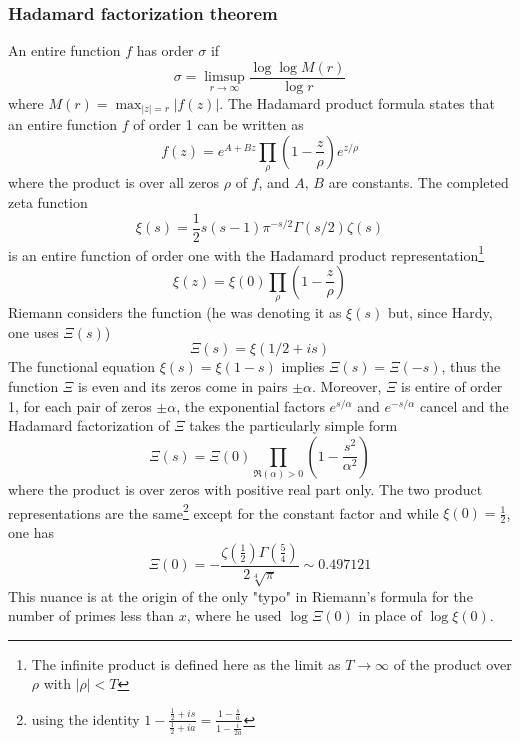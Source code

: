 \documentclass{article}
\begin{document}
   \subsubsection{Hadamard factorization theorem}\label{hadfact} An entire function $f$ has order $\sigma$ if
$$\sigma = \limsup_{r \to \infty} \frac{\log \log M(r)}{\log r}$$
where $M(r) = \max_{|z|=r} |f(z)|$. The Hadamard product formula states that an entire function $f$ of order 1 can be written as
$$f(z) = e^{A + Bz} \prod_{\rho} \left(1 - \frac{z}{\rho}\right) e^{z/\rho}$$
where the product is over all zeros $\rho$ of $f$, and $A$, $B$ are constants. 
The completed zeta function 
\begin{equation}\label{smallxi}
	\xi(s) = \frac{1}{2}s(s-1)\pi^{-s/2}\Gamma(s/2)\zeta(s)
\end{equation}
 is an entire function of order one with the Hadamard product representation\footnote{The infinite product is defined here as the limit as $T\to \infty$ of the product over $\rho$ with $\vert \rho\vert<T$ } \cite{HadamardFactor, Boas, LevinBook}
 \[
    \xi(z) = \xi(0) \prod_{\rho} \left(1 - \frac{z}{\rho}\right)
    \]
Riemann considers the function (he was denoting it as $\xi(s)$ but, since Hardy, one uses $\Xi(s)$)
\begin{equation}\label{bigxi}
	\Xi(s) = \xi(1/2 + is)
\end{equation}
 The functional equation $\xi(s) = \xi(1-s)$ implies $\Xi(s) = \Xi(-s)$, thus the function $\Xi$ is even and its zeros come in pairs $\pm\alpha$. Moreover, $\Xi$ is entire of order 1,  for each pair of zeros $\pm\alpha$, the exponential factors $e^{s/\alpha}$ and $e^{-s/\alpha}$ cancel and the Hadamard factorization of $\Xi$ takes the particularly simple form
$$\Xi(s) = \Xi(0) \prod_{\Re(\alpha) > 0} \left(1 - \frac{s^2}{\alpha^2}\right)$$
where the product is over  zeros with positive real part only. The two product representations are the same\footnote{using the identity $1-\frac{\frac{1}{2}+i s}{\frac{1}{2}+i a}=\frac{1-\frac{s}{a}}{1-\frac{i}{2 a}}$} except for the constant factor and while $\xi(0)=\frac 12$, one has $$\Xi(0)=-\frac{\zeta \left(\frac{1}{2}\right) \Gamma \left(\frac{5}{4}\right)}{2 \sqrt[4]{\pi }}\sim 0.497121$$ This nuance is at the origin of the only "typo" in Riemann's formula for the number of primes less than $x$, where he used $\log \Xi(0)$ in place of $\log \xi(0)$.
\end{document}
